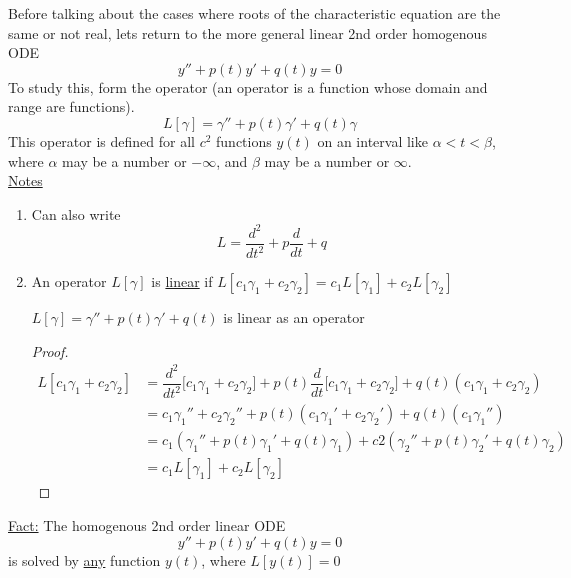 Before talking about the cases where roots of the characteristic equation are the same or not real, lets return to the more general linear 2nd order homogenous ODE
\begin{equation*}
	y'' + p(t)y' + q(t)y = 0
\end{equation*}
To study this, form the operator (an operator is a function whose domain and range are functions).
\begin{equation*}
	L[\gamma] = \gamma'' + p(t)\gamma' + q(t) \gamma
\end{equation*}
This operator is defined for all $c^2$ functions $y(t)$ on an interval like $\alpha < t < \beta$, where $\alpha$ may be a number or $-\infty$, and $\beta$ may be a number or $\infty$.\\
\underline{\large Notes}
\begin{enumerate}[label=\protect\circled{\Roman*}]
	\item Can also write
	\begin{equation*}
		L = \dfrac{d^2}{dt^2} + p\dfrac{d}{dt} + q
	\end{equation*}
	\item An operator $L[\gamma]$ is \underline{linear} if $L[c_1\gamma_1 + c_2\gamma_2] = c_1L[\gamma_1] + c_2L[\gamma_2]$
	\begin{claim}
		$L[\gamma] = \gamma'' + p(t)\gamma' + q(t)$ is linear as an operator
	\end{claim}
	\begin{proof}
	\begin{align*}
		L[c_1\gamma_1 + c_2\gamma_2] & = \dfrac{d^2}{dt^2}\big[ c_1\gamma_1 + c_2\gamma_2\big] + p(t) \dfrac{d}{dt}\big[ c_1\gamma_1 + c_2\gamma_2 \big] +q(t)(c_1\gamma_1 + c_2\gamma_2)\\
		& = c_1\gamma_1'' + c_2\gamma_2'' + p(t)(c_1\gamma_1' + c_2\gamma_2') + q(t)(c_1\gamma_1'')\\
		& = c_1(\gamma_1'' + p(t)\gamma_1' + q(t)\gamma_1) + c2(\gamma_2'' + p(t)\gamma_2' + q(t)\gamma_2)\\
		& = c_1L[\gamma_1] + c_2L[\gamma_2]
	\end{align*}
	\end{proof}
\end{enumerate}
\underline{\large Fact:} The homogenous 2nd order linear ODE
\begin{equation*}
	y'' + p(t)y' + q(t)y = 0
\end{equation*}
is solved by \underline{any} function $y(t)$, where $L[y(t)] = 0$\\
